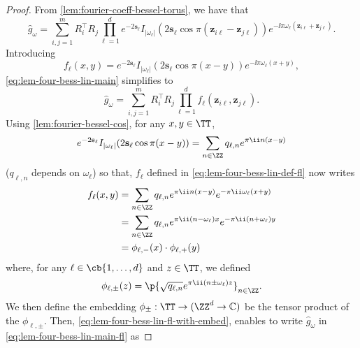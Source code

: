 \documentclass{article}
\begin{document}
\begin{proof}
  From \cref{lem:fourier-coeff-bessel-torus}, we have that
  \begin{equation}\label{eq:lem-four-bess-lin-main}
    \hat{g}_\omega = \sum_{i, j = 1}^m R_i^\top R_j \prod_{\ell = 1}^{d} e^{-2 \mathbf{s}_\ell} I_{|\omega_\ell|}(2 \mathbf{s}_\ell \cos \pi (\mathbf{z}_{i \ell} - \mathbf{z}_{j \ell})) e^{-\ii \pi \omega_\ell (\mathbf{z}_{i \ell} + \mathbf{z}_{j \ell})}.
  \end{equation}
  Introducing
  \begin{equation}\label{eq:lem-four-bess-lin-def-fl}
    f_\ell(x, y) = e^{-2 \mathbf{s}_\ell} I_{|\omega_\ell|}(2 \mathbf{s}_\ell \cos \pi (x - y)) e^{-\ii \pi \omega_\ell (x + y)},
  \end{equation}
  \cref{eq:lem-four-bess-lin-main} simplifies to
  \begin{equation}\label{eq:lem-four-bess-lin-main-fl}
    \hat{g}_\omega = \sum_{i, j = 1}^m R_i^\top R_j \prod_{\ell = 1}^{d} f_\ell(\mathbf{z}_{i \ell}, \mathbf{z}_{j \ell}).
  \end{equation}
  Using \cref{lem:fourier-bessel-cos}, for any $x, y \in \TT$,
  \begin{equation*}
    e^{-2 \mathbf{s}_\ell} I_{|\omega_\ell|}(2 \mathbf{s}_\ell \cos \pi (x - y)) = \sum_{n \in \ZZ} q_{\ell, n} e^{\pi \ii n (x - y)}
  \end{equation*}
  ($q_{\ell, n}$ depends on $\omega_\ell$) so that, $f_\ell$ defined in \cref{eq:lem-four-bess-lin-def-fl} now writes
  \begin{align}
    f_\ell(x, y)
     & = \sum_{n \in \ZZ} q_{\ell, n} e^{\pi \ii n (x-y)} e^{-\pi \ii \omega_\ell (x + y)}  \notag              \\
     & = \sum_{n \in \ZZ} q_{\ell, n} e^{\pi \ii (n - \omega_\ell) x} e^{- \pi \ii (n + \omega_\ell) y}  \notag \\
     & = \phi_{\ell, -}(x) \cdot \phi_{\ell, +}(y) \label{eq:lem-four-bess-lin-fl-with-embed}
  \end{align}
  where, for any $\ell \in \cb{1, \dots, d}$ and $z \in \TT$, we defined
  \begin{equation}\label{eq:lem-four-bess-lin-def-embed}
    \phi_{\ell, \pm}(z) = \p{\sqrt{q_{\ell, n}} e^{\pi \ii (n \pm \omega_\ell) z}}_{n \in \ZZ}.
  \end{equation}
  We then define the embedding $\phi_{\pm}: \TT \to (\ZZ^d \to \mathbb{C})$ be the tensor product of the $\phi_{\ell, \pm}$.
  Then, \cref{eq:lem-four-bess-lin-fl-with-embed}, enables to write $\hat{g}_\omega$ in \cref{eq:lem-four-bess-lin-main-fl} as

\end{proof}
\end{document}
